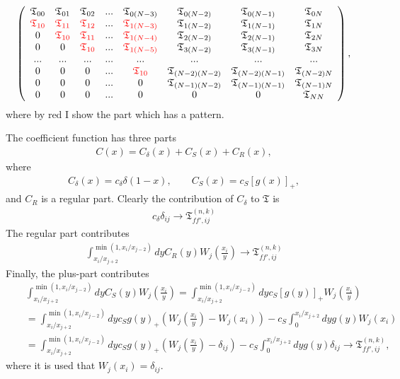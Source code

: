 \documentclass[prd,nofootinbib,eqsecnum,final]{revtex4}
\newcommand{\nn}{\nonumber}
\renewcommand{\(}{\left(}
\renewcommand{\)}{\right)}
\renewcommand{\[}{\left[}
\renewcommand{\]}{\right]}
\newcommand{\red}[1]{{\color[rgb]{1,0,0} #1}}
\begin{document}
\begin{eqnarray}
\left(
\begin{array}{cccccccc}
\mathfrak{T}_{00} & \mathfrak{T}_{01} & \mathfrak{T}_{02} & ... & \mathfrak{T}_{0(N-3)} & \mathfrak{T}_{0(N-2)} & \mathfrak{T}_{0(N-1)} & \mathfrak{T}_{0N}
\\
\red{\mathfrak{T}_{10}} & \red{\mathfrak{T}_{11}} & \red{\mathfrak{T}_{12}} & ... & \red{\mathfrak{T}_{1(N-3)}} & \mathfrak{T}_{1(N-2)} & \mathfrak{T}_{1(N-1)} & \mathfrak{T}_{1N}
\\
0 & \red{\mathfrak{T}_{10}} & \red{\mathfrak{T}_{11}} & ... & \red{\mathfrak{T}_{1(N-4)}} & \mathfrak{T}_{2(N-2)} & \mathfrak{T}_{2(N-1)} & \mathfrak{T}_{2N}
\\
0 & 0 & \red{\mathfrak{T}_{10}} & ... & \red{\mathfrak{T}_{1(N-5)}} & \mathfrak{T}_{3(N-2)} & \mathfrak{T}_{3(N-1)} & \mathfrak{T}_{3N}
\\ ... & ... &... &... &... &... &... &... 
\\
0 & 0 & 0 & ... & \red{\mathfrak{T}_{10}} & \mathfrak{T}_{(N-2)(N-2)} & \mathfrak{T}_{(N-2)(N-1)} & \mathfrak{T}_{(N-2)N}
\\
0 & 0 & 0 & ... & 0 & \mathfrak{T}_{(N-1)(N-2)} & \mathfrak{T}_{(N-1)(N-1)} & \mathfrak{T}_{(N-1)N}
\\
0 & 0 & 0 & ... & 0 & 0 & 0 & \mathfrak{T}_{NN}
\end{array}
\right),
\end{eqnarray}
where by red I show the part which has a pattern.

The coefficient function has three parts
\begin{eqnarray}
C(x)=C_\delta(x)+C_S(x)+C_R(x),
\end{eqnarray}
where
\begin{eqnarray}
C_\delta(x)=c_\delta \delta(1-x),\qquad
C_S(x)=c_S [g(x)]_+,
\end{eqnarray}
and $C_R$ is a regular part. Clearly the contribution of $C_\delta$ to $\mathfrak{T}$ is
\begin{eqnarray}
c_\delta \delta_{ij} \to \mathfrak{T}_{ff',ij}^{(n,k)}
\end{eqnarray}
The regular part contributes
\begin{eqnarray}
\int_{x_i/x_{j+2}}^{\min(1,x_i/x_{j-2})}dy C_R(y)W_j\(\frac{x_i}{y}\)\to \mathfrak{T}_{ff',ij}^{(n,k)}
\end{eqnarray}
Finally, the plus-part contributes
\begin{eqnarray}
&&\int_{x_i/x_{j+2}}^{\min(1,x_i/x_{j-2})}dy C_S(y)W_j\(\frac{x_i}{y}\)
=\int_{x_i/x_{j+2}}^{\min(1,x_i/x_{j-2})}dy c_S[g(y)]_+W_j\(\frac{x_i}{y}\)
\\\nn
&&=\int_{x_i/x_{j+2}}^{\min(1,x_i/x_{j-2})}dy c_S g(y)_+(W_j\(\frac{x_i}{y}\)-W_j(x_i))-c_S\int_0^{x_i/x_{j+2}} dy g(y)W_j(x_i)
\\\nn
&&=\int_{x_i/x_{j+2}}^{\min(1,x_i/x_{j-2})}dy c_S g(y)_+(W_j\(\frac{x_i}{y}\)-\delta_{ij})-c_S\int_0^{x_i/x_{j+2}} dy g(y)\delta_{ij}
\to \mathfrak{T}_{ff',ij}^{(n,k)},
\end{eqnarray}
where it is used that $W_j(x_i)=\delta_{ij}$.
\end{document}
